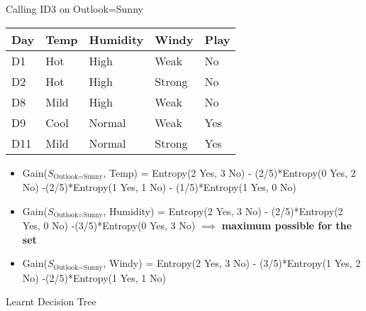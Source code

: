 \documentclass[dvipsnames]{beamer}
\begin{document}
	\begin{frame}{Calling ID3 on Outlook=Sunny}
\begin{tabular}{llll||l} \toprule
	\textbf{Day} & \textbf{Temp} & \textbf{Humidity} & \textbf{Windy}  & \textbf{Play} \\ \midrule
	D1    & Hot  & High     & Weak   & No   \\
	D2     & Hot  & High     & Strong & No   \\
	D8     & Mild & High     & Weak   & No   \\
	D9    & Cool & Normal   & Weak   & Yes  \\
	D11    & Mild & Normal   & Strong & Yes  \\ \bottomrule
\end{tabular}

\begin{itemize}[<*>]
    \item Gain($S_{\text{Outlook=Sunny}}$, Temp) = Entropy(2 Yes, 3 No) - (2/5)*Entropy(0 Yes, 2 No) -(2/5)*Entropy(1 Yes, 1 No) - (1/5)*Entropy(1 Yes, 0 No) 
    \item Gain($S_{\text{Outlook=Sunny}}$, Humidity) = Entropy(2 Yes, 3 No) - (2/5)*Entropy(2 Yes, 0 No) -(3/5)*Entropy(0 Yes, 3 No) $\implies$ \textbf{maximum possible for the set}
    \item Gain($S_{\text{Outlook=Sunny}}$, Windy) = Entropy(2 Yes, 3 No) - (3/5)*Entropy(1 Yes, 2 No) -(2/5)*Entropy(1 Yes, 1 No) 
\end{itemize}
\end{frame}

\begin{frame}{Learnt Decision Tree}

\end{frame}
\end{document}
